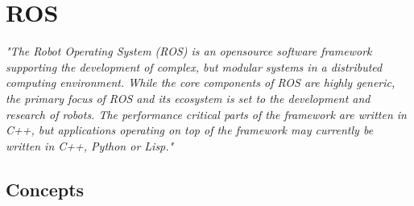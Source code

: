 \chapter{ROS} %
\label{appendix:ros}
\textit{"The Robot Operating System (ROS) is an opensource software framework supporting the development of complex, but modular systems in a distributed computing environment. While the core components of ROS are highly generic, the primary focus of ROS and its ecosystem is set to the development and research of robots. The performance critical parts of the framework are written in C++, but applications operating on top of the framework may currently be written in C++, Python or Lisp."}\cite{7795766} \par

\section{Concepts} %
\label{sec:concepts}
